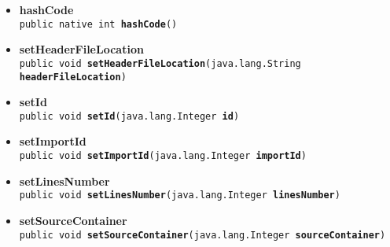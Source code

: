 {{{{{{\begin{itemize}
{\texttt{public java.lang.String\ {\bf  getSrcFileLocation}()
\label{it.unisa.sesa.repominer.db.entities.Type.getSrcFileLocation()}}%
}%
\item{ 
\hypertarget{it.unisa.sesa.repominer.db.entities.Type.hashCode()}{{\bf  hashCode}\\}
\texttt{public native int\ {\bf  hashCode}()
\label{it.unisa.sesa.repominer.db.entities.Type.hashCode()}}%
}%
\item{ 
\hypertarget{it.unisa.sesa.repominer.db.entities.Type.setHeaderFileLocation(java.lang.String)}{{\bf  setHeaderFileLocation}\\}
\texttt{public void\ {\bf  setHeaderFileLocation}(\texttt{java.lang.String} {\bf  headerFileLocation})
\label{it.unisa.sesa.repominer.db.entities.Type.setHeaderFileLocation(java.lang.String)}}%
}%
\item{ 
\hypertarget{it.unisa.sesa.repominer.db.entities.Type.setId(java.lang.Integer)}{{\bf  setId}\\}
\texttt{public void\ {\bf  setId}(\texttt{java.lang.Integer} {\bf  id})
\label{it.unisa.sesa.repominer.db.entities.Type.setId(java.lang.Integer)}}%
}%
\item{ 
\hypertarget{it.unisa.sesa.repominer.db.entities.Type.setImportId(java.lang.Integer)}{{\bf  setImportId}\\}
\texttt{public void\ {\bf  setImportId}(\texttt{java.lang.Integer} {\bf  importId})
\label{it.unisa.sesa.repominer.db.entities.Type.setImportId(java.lang.Integer)}}%
}%
\item{ 
\hypertarget{it.unisa.sesa.repominer.db.entities.Type.setLinesNumber(java.lang.Integer)}{{\bf  setLinesNumber}\\}
\texttt{public void\ {\bf  setLinesNumber}(\texttt{java.lang.Integer} {\bf  linesNumber})
\label{it.unisa.sesa.repominer.db.entities.Type.setLinesNumber(java.lang.Integer)}}%
}%
\item{ 
\hypertarget{it.unisa.sesa.repominer.db.entities.Type.setSourceContainer(java.lang.Integer)}{{\bf  setSourceContainer}\\}
\texttt{public void\ {\bf  setSourceContainer}(\texttt{java.lang.Integer} {\bf  sourceContainer})
\label{it.unisa.sesa.repominer.db.entities.Type.setSourceContainer(java.lang.Integer)}}%
}
\end{itemize}}}}}}}

